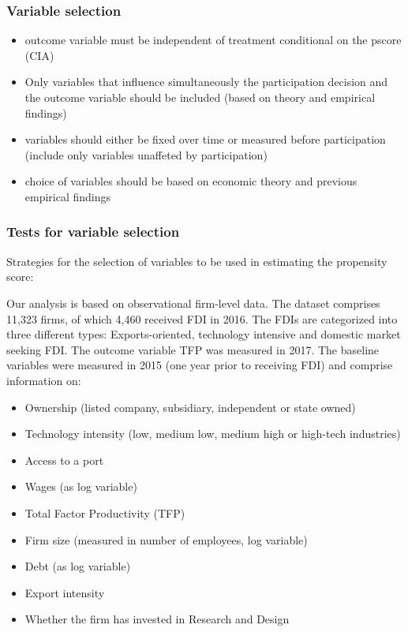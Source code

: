 \documentclass[a4paper,11pt]{scrartcl}
\begin{document}
\subsubsection*{Variable selection}
\begin{itemize}
\item outcome variable must be independent of treatment conditional on the pscore (CIA)
\item Only variables that influence simultaneously the participation decision and the outcome variable should be included (based on theory and empirical findings)
\item variables should either be fixed over time or measured before participation (include only variables unaffeted by participation)
\item choice of variables should be based on economic theory and previous empirical findings
\end{itemize}

\subsubsection*{Tests for variable selection}
Strategies for the selection of variables to be used in estimating the propensity score:


Our analysis is based on observational firm-level data. The dataset comprises 11,323 firms, of which 4,460 received FDI in 2016. The FDIs are categorized into three different types: Exports-oriented, technology intensive and domestic market seeking FDI. The outcome variable TFP was measured in 2017. The baseline variables were measured in 2015 (one year prior to receiving FDI) and comprise information on:


\begin{itemize}
\item Ownership (listed company, subsidiary, independent or state owned)
\item Technology intensity (low, medium low, medium high or high-tech industries) 
\item Access to a port
\item Wages (as log variable)
\item Total Factor Productivity (TFP)
\item Firm size (measured in number of employees, log variable)
\item Debt (as log variable)
\item Export intensity
\item Whether the firm has invested in Research and Design
\end{itemize}
\end{document}
